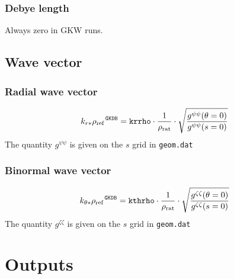 \documentclass[a4paper]{report}
\begin{document}
\subsection{Debye length}
Always zero in GKW runs.

\section{Wave vector}
\subsection{Radial wave vector}
\begin{equation}
\left. k_{r*}\rho_{\textrm{ref}}\right.^{\texttt{GKDB}} = \texttt{krrho}\cdot\frac{1}{\rho_\textrm{rat}}\cdot\sqrt{\frac{g^{\psi\psi}(\theta=0)}{g^{\psi\psi}(s=0)}}
\end{equation}
The quantity $g^{\psi \psi}$ is given on the $s$ grid in \texttt{geom.dat}

\subsection{Binormal wave vector}
\begin{equation}
\left. k_{\theta*}\rho_{\textrm{ref}}\right.^{\texttt{GKDB}} = \texttt{kthrho}\cdot\frac{1}{\rho_\textrm{rat}}\cdot\sqrt{\frac{g^{\zeta\zeta}(\theta=0)}{g^{\zeta\zeta}(s=0)}}
\end{equation}
The quantity $g^{\zeta \zeta}$ is given on the $s$ grid in \texttt{geom.dat}


\chapter{Outputs}
\end{document}
